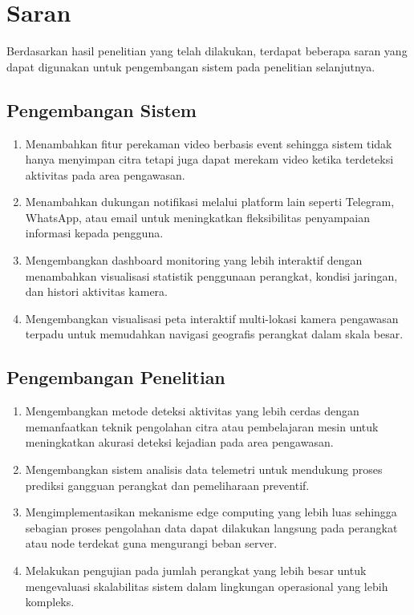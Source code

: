 \section{Saran}

Berdasarkan hasil penelitian yang telah dilakukan, terdapat beberapa saran yang dapat digunakan untuk pengembangan sistem pada penelitian selanjutnya.

\subsection{Pengembangan Sistem}

\begin{enumerate}
	
	\item Menambahkan fitur perekaman video berbasis event sehingga sistem tidak hanya menyimpan citra tetapi juga dapat merekam video ketika terdeteksi aktivitas pada area pengawasan.
	
	\item Menambahkan dukungan notifikasi melalui platform lain seperti Telegram, WhatsApp, atau email untuk meningkatkan fleksibilitas penyampaian informasi kepada pengguna.
	
	\item Mengembangkan dashboard monitoring yang lebih interaktif dengan menambahkan visualisasi statistik penggunaan perangkat, kondisi jaringan, dan histori aktivitas kamera.
	
	\item Mengembangkan visualisasi peta interaktif multi-lokasi kamera pengawasan terpadu untuk memudahkan navigasi geografis perangkat dalam skala besar.
	
\end{enumerate}

\subsection{Pengembangan Penelitian}

\begin{enumerate}
	
	\item Mengembangkan metode deteksi aktivitas yang lebih cerdas dengan memanfaatkan teknik pengolahan citra atau pembelajaran mesin untuk meningkatkan akurasi deteksi kejadian pada area pengawasan.
	
	\item Mengembangkan sistem analisis data telemetri untuk mendukung proses prediksi gangguan perangkat dan pemeliharaan preventif.
	
	\item Mengimplementasikan mekanisme edge computing yang lebih luas sehingga sebagian proses pengolahan data dapat dilakukan langsung pada perangkat atau node terdekat guna mengurangi beban server.
	
	\item Melakukan pengujian pada jumlah perangkat yang lebih besar untuk mengevaluasi skalabilitas sistem dalam lingkungan operasional yang lebih kompleks.
	
\end{enumerate}